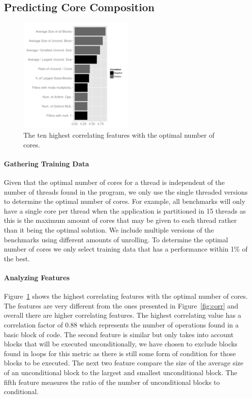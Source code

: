 \subsection{Predicting Core Composition}

\vspace{2mm}
\begin{figure}
  \includegraphics[width=0.51\textwidth]{streamit-paper/graphics/coreCorr.pdf}
  \caption{The ten highest correlating features with the optimal number of cores.}\label{fig:corrCore}
  \vspace{4mm}
\end{figure}
\paragraph{Gathering Training Data}
Given that the optimal number of cores for a thread is independent of the number of threads found in the program, we only use the single threaded versions to determine the optimal number of cores.
For example, all benchmarks will only have a single core per thread when the application is partitioned in 15 threads as this is the maximum amount of cores that may be given to each thread rather than it being the optimal solution. 
We include multiple versions of the benchmarks using different amounts of unrolling.
To determine the optimal number of cores we only select training data that has a performance within 1\% of the best. 
  \vspace{2mm}

\paragraph{Analyzing Features}

Figure~\ref{fig:corrCore} shows the highest correlating features with the optimal number of cores.
The features are very different from the ones presented in Figure~\ref{fig:corr} and overall there are higher correlating features.
The highest correlating value has a correlation factor of 0.88 which represents the number of operations found in a basic block of code.
The second feature is similar but only takes into account blocks that will be executed unconditionally, we have chosen to exclude blocks found in loops for this metric as there is still some form of condition for those blocks to be executed.
The next two feature compare the size of the average size of an unconditional block to the largest and smallest unconditional block.
The fifth feature measures the ratio of the number of unconditional blocks to conditional.

